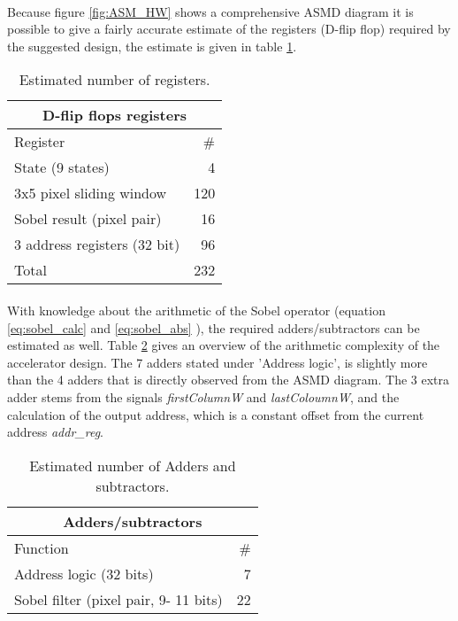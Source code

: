 \paragraph*{}
Because figure \ref{fig:ASM_HW} shows a comprehensive ASMD diagram it is possible to give a fairly accurate estimate of the registers (D-flip flop) required by the suggested design, the estimate is given in table \ref{tab:designRegisters}. 
\begin{table}[h]
	\centering
	\begin{tabular}{lr}
	\hline
	\multicolumn{2}{c}{D-flip flops registers} \\ \hline
	Register						& \# \\ \hline
	State (9 states)				& 4 \\
	3x5 pixel sliding window		& 120 \\
	Sobel result (pixel pair)		& 16 \\
	3 address registers (32 bit)	& 96 \\ \hline
	Total							& 232 \\ \hline
	\end{tabular}
	\caption{Estimated number of registers.}
	\label{tab:designRegisters}
\end{table}

\paragraph*{}
With knowledge about the arithmetic of the Sobel operator (equation \ref{eq:sobel_calc} and \ref{eq:sobel_abs} ), the required adders/subtractors can be estimated as well.
Table \ref{tab:designAdders} gives an overview of the arithmetic complexity of the accelerator design. The 7 adders stated under 'Address logic', is slightly more than the 4 adders that is directly observed from the ASMD diagram.
The 3 extra adder stems from the signals \emph{firstColumnW} and \emph{lastColoumnW}, and the calculation of the output address, which is a constant offset from the current address \emph{addr\_reg}.
 
\begin{table}[h]
	\centering
	\begin{tabular}{lr}
	\hline
	\multicolumn{2}{c}{Adders/subtractors} \\ \hline
	Function						& \# \\ \hline
	Address logic (32 bits)			& 7 \\
	Sobel filter (pixel pair, 9- 11 bits)		& 22 \\  \hline
	\end{tabular}
	\caption{Estimated number of Adders and subtractors.}
	\label{tab:designAdders}
\end{table}

